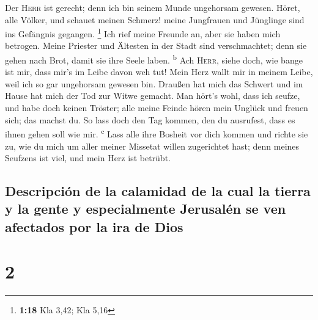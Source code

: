  Der \textsc{Herr} ist gerecht; denn ich bin seinem Munde
ungehorsam gewesen. Höret, alle Völker, und schauet meinen Schmerz!
meine Jungfrauen und Jünglinge sind ins Gefängnis gegangen. \footnote{\textbf{1:18}
  Kla 3,42; Kla 5,16}  Ich rief meine Freunde an, aber
sie haben mich betrogen. Meine Priester und Ältesten in der Stadt sind
verschmachtet; denn sie gehen nach Brot, damit sie ihre Seele laben.
\textsuperscript{b}  Ach \textsc{Herr}, siehe doch, wie
bange ist mir, dass mir's im Leibe davon weh tut! Mein Herz wallt mir in
meinem Leibe, weil ich so gar ungehorsam gewesen bin. Draußen hat mich
das Schwert und im Hause hat mich der Tod zur Witwe gemacht.
 Man hört's wohl, dass ich seufze, und habe doch keinen
Tröster; alle meine Feinde hören mein Unglück und freuen sich; das
machst du. So lass doch den Tag kommen, den du ausrufest, dass es ihnen
gehen soll wie mir. \textsuperscript{c}  Lass alle ihre
Bosheit vor dich kommen und richte sie zu, wie du mich um aller meiner
Missetat willen zugerichtet hast; denn meines Seufzens ist viel, und
mein Herz ist betrübt.

\hypertarget{descripciuxf3n-de-la-calamidad-de-la-cual-la-tierra-y-la-gente-y-especialmente-jerusaluxe9n-se-ven-afectados-por-la-ira-de-dios}{%
\subsection{Descripción de la calamidad de la cual la tierra y la gente
y especialmente Jerusalén se ven afectados por la ira de
Dios}\label{descripciuxf3n-de-la-calamidad-de-la-cual-la-tierra-y-la-gente-y-especialmente-jerusaluxe9n-se-ven-afectados-por-la-ira-de-dios}}

\hypertarget{section-1}{%
\section{2}\label{section-1}}

